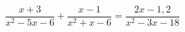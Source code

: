 \begin{ex}[type=equation]
	\begin{condition}
		$\dfrac{x + 3}{x^2 - 5x - 6} + \dfrac{x - 1}{x^2 + x -6} = \dfrac{2x -1,2}{x^2 - 3x -18}$
	\end{condition}
\end{ex}